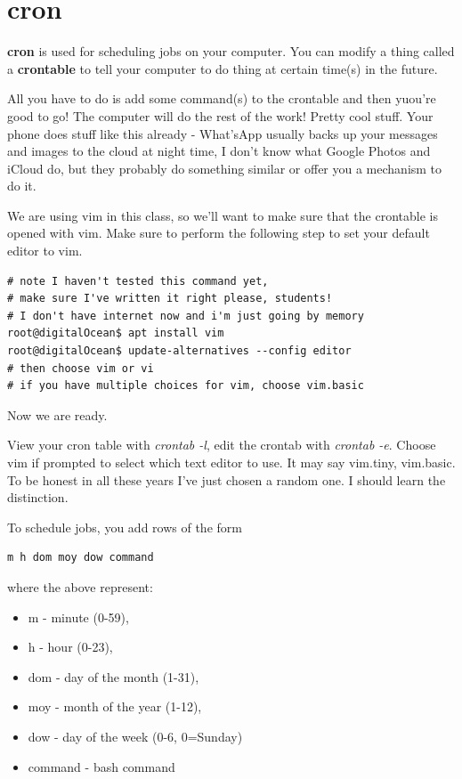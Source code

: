 \documentclass[12pt,a4paper]{article}
\begin{document}
\section{cron}
\textbf{cron} is used for scheduling jobs on your computer. You can modify a
thing called a \textbf{crontable} to tell your computer to do thing at certain time(s) in the future.

All you have to do is add some command(s) to the crontable and then yuou're good
to go! The computer will do the rest of the work! Pretty cool stuff. Your phone
does stuff like this already - What'sApp usually backs up your messages and
images to the cloud at night time, I don't know what Google Photos and iCloud
do, but they probably do something similar or offer you a mechanism to do  it.

We are using vim in this class, so we'll want to make sure that the crontable is
opened with vim. Make sure to perform the following step to set your default
editor to vim.

\begin{lstlisting}[style=term]
# note I haven't tested this command yet,
# make sure I've written it right please, students!
# I don't have internet now and i'm just going by memory
root@digitalOcean$ apt install vim
root@digitalOcean$ update-alternatives --config editor
# then choose vim or vi
# if you have multiple choices for vim, choose vim.basic
\end{lstlisting}

Now we are ready.

View your cron table with \textit{crontab -l}, edit the crontab with \textit{crontab -e}.
Choose vim if prompted to  select which text editor to use. It may say vim.tiny,
vim.basic. To be honest in all these years I've just chosen a random one. I
should learn the distinction.

To schedule jobs, you add rows of the form
\begin{lstlisting}
m h dom moy dow command
\end{lstlisting}

where the above represent:

\begin{itemize}
\item m - minute (0-59),
\item h - hour (0-23),
\item dom - day of the month (1-31),
\item moy - month of the year (1-12),
\item dow - day of the week (0-6, 0=Sunday)
\item command - bash command
\end{itemize}
\end{document}
